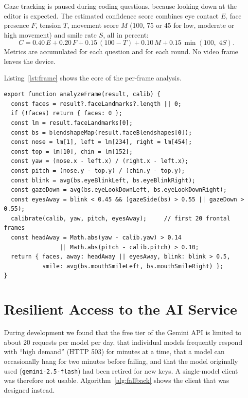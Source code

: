 \documentclass[12pt,a4paper,oneside]{report}
\begin{document}
Gaze tracking is paused during coding questions, because looking down at the editor is expected. The estimated confidence score combines eye contact $E$, face presence $F$, tension $T$, movement score $M$ (100, 75 or 45 for low, moderate or high movement) and smile rate $S$, all in percent:
\begin{equation}
C = 0.40\,E + 0.20\,F + 0.15\,(100 - T) + 0.10\,M + 0.15\,\min(100,\; 4S).
\end{equation}
Metrics are accumulated for each question and for each round. No video frame leaves the device.

Listing~\ref{lst:frame} shows the core of the per-frame analysis.

\begin{lstlisting}[caption={Per-frame head-pose and gaze analysis (simplified from \texttt{faceAnalyzer.js})},label={lst:frame}]
export function analyzeFrame(result, calib) {
  const faces = result?.faceLandmarks?.length || 0;
  if (!faces) return { faces: 0 };
  const lm = result.faceLandmarks[0];
  const bs = blendshapeMap(result.faceBlendshapes[0]);
  const nose = lm[1], left = lm[234], right = lm[454];
  const top = lm[10], chin = lm[152];
  const yaw = (nose.x - left.x) / (right.x - left.x);
  const pitch = (nose.y - top.y) / (chin.y - top.y);
  const blink = avg(bs.eyeBlinkLeft, bs.eyeBlinkRight);
  const gazeDown = avg(bs.eyeLookDownLeft, bs.eyeLookDownRight);
  const eyesAway = blink < 0.45 && (gazeSide(bs) > 0.55 || gazeDown > 0.55);
  calibrate(calib, yaw, pitch, eyesAway);     // first 20 frontal frames
  const headAway = Math.abs(yaw - calib.yaw) > 0.14
                || Math.abs(pitch - calib.pitch) > 0.10;
  return { faces, away: headAway || eyesAway, blink: blink > 0.5,
           smile: avg(bs.mouthSmileLeft, bs.mouthSmileRight) };
}
\end{lstlisting}

\section{Resilient Access to the AI Service}
During development we found that the free tier of the Gemini API is limited to about 20 requests per model per day, that individual models frequently respond with ``high demand'' (HTTP 503) for minutes at a time, that a model can occasionally hang for two minutes before failing, and that the model originally used (\texttt{gemini-2.5-flash}) had been retired for new keys. A single-model client was therefore not usable. Algorithm~\ref{alg:fallback} shows the client that was designed instead.
\end{document}
